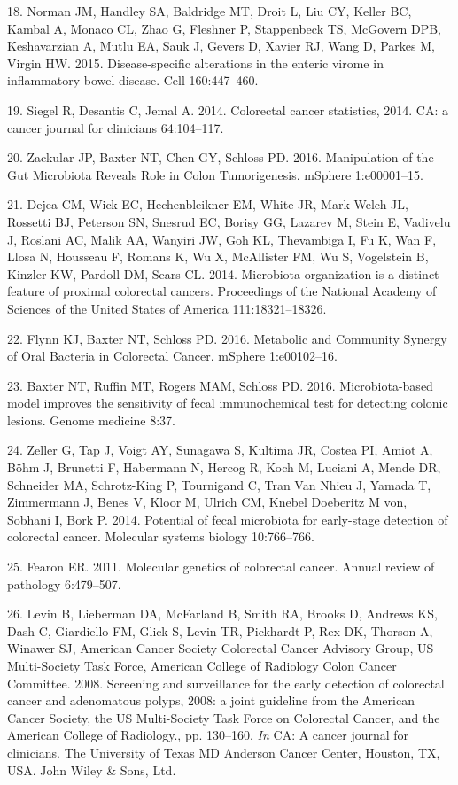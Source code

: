 \documentclass[12pt,]{article}
\begin{document}
\hypertarget{ref-Norman:2015kb}{}
18. Norman JM, Handley SA, Baldridge MT, Droit L, Liu CY, Keller BC,
Kambal A, Monaco CL, Zhao G, Fleshner P, Stappenbeck TS, McGovern DPB,
Keshavarzian A, Mutlu EA, Sauk J, Gevers D, Xavier RJ, Wang D, Parkes M,
Virgin HW. 2015. Disease-specific alterations in the enteric virome in
inflammatory bowel disease. Cell 160:447--460.

\hypertarget{ref-Siegel:2014jo}{}
19. Siegel R, Desantis C, Jemal A. 2014. Colorectal cancer statistics,
2014. CA: a cancer journal for clinicians 64:104--117.

\hypertarget{ref-Zackular:2016en}{}
20. Zackular JP, Baxter NT, Chen GY, Schloss PD. 2016. Manipulation of
the Gut Microbiota Reveals Role in Colon Tumorigenesis. mSphere
1:e00001--15.

\hypertarget{ref-Dejea:2014fz}{}
21. Dejea CM, Wick EC, Hechenbleikner EM, White JR, Mark Welch JL,
Rossetti BJ, Peterson SN, Snesrud EC, Borisy GG, Lazarev M, Stein E,
Vadivelu J, Roslani AC, Malik AA, Wanyiri JW, Goh KL, Thevambiga I, Fu
K, Wan F, Llosa N, Housseau F, Romans K, Wu X, McAllister FM, Wu S,
Vogelstein B, Kinzler KW, Pardoll DM, Sears CL. 2014. Microbiota
organization is a distinct feature of proximal colorectal cancers.
Proceedings of the National Academy of Sciences of the United States of
America 111:18321--18326.

\hypertarget{ref-Flynn:2016iu}{}
22. Flynn KJ, Baxter NT, Schloss PD. 2016. Metabolic and Community
Synergy of Oral Bacteria in Colorectal Cancer. mSphere 1:e00102--16.

\hypertarget{ref-Baxter:2016dja}{}
23. Baxter NT, Ruffin MT, Rogers MAM, Schloss PD. 2016. Microbiota-based
model improves the sensitivity of fecal immunochemical test for
detecting colonic lesions. Genome medicine 8:37.

\hypertarget{ref-Zeller:2014ix}{}
24. Zeller G, Tap J, Voigt AY, Sunagawa S, Kultima JR, Costea PI, Amiot
A, Böhm J, Brunetti F, Habermann N, Hercog R, Koch M, Luciani A, Mende
DR, Schneider MA, Schrotz-King P, Tournigand C, Tran Van Nhieu J, Yamada
T, Zimmermann J, Benes V, Kloor M, Ulrich CM, Knebel Doeberitz M von,
Sobhani I, Bork P. 2014. Potential of fecal microbiota for early-stage
detection of colorectal cancer. Molecular systems biology 10:766--766.

\hypertarget{ref-Fearon:2011go}{}
25. Fearon ER. 2011. Molecular genetics of colorectal cancer. Annual
review of pathology 6:479--507.

\hypertarget{ref-Levin:2008kz}{}
26. Levin B, Lieberman DA, McFarland B, Smith RA, Brooks D, Andrews KS,
Dash C, Giardiello FM, Glick S, Levin TR, Pickhardt P, Rex DK, Thorson
A, Winawer SJ, American Cancer Society Colorectal Cancer Advisory Group,
US Multi-Society Task Force, American College of Radiology Colon Cancer
Committee. 2008. Screening and surveillance for the early detection of
colorectal cancer and adenomatous polyps, 2008: a joint guideline from
the American Cancer Society, the US Multi-Society Task Force on
Colorectal Cancer, and the American College of Radiology., pp. 130--160.
\emph{In} CA: A cancer journal for clinicians. The University of Texas
MD Anderson Cancer Center, Houston, TX, USA. John Wiley \& Sons, Ltd.
\end{document}
